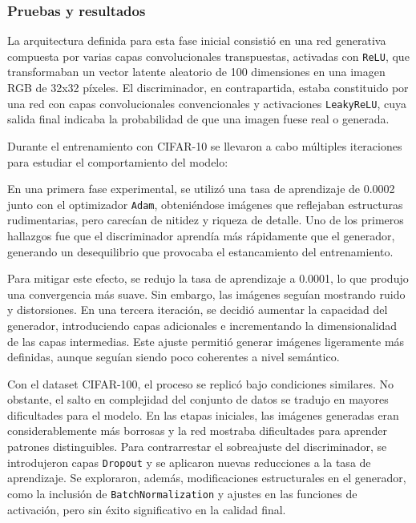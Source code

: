 \subsubsection{Pruebas y resultados}

La arquitectura definida para esta fase inicial consistió en una red generativa compuesta por varias capas convolucionales transpuestas, activadas con \texttt{ReLU}, que transformaban un vector latente aleatorio de 100 dimensiones en una imagen RGB de 32x32 píxeles. El discriminador, en contrapartida, estaba constituido por una red con capas convolucionales convencionales y activaciones \texttt{LeakyReLU}, cuya salida final indicaba la probabilidad de que una imagen fuese real o generada.

Durante el entrenamiento con CIFAR-10 se llevaron a cabo múltiples iteraciones para estudiar el comportamiento del modelo:

En una primera fase experimental, se utilizó una tasa de aprendizaje de 0.0002 junto con el optimizador \texttt{Adam}, obteniéndose imágenes que reflejaban estructuras rudimentarias, pero carecían de nitidez y riqueza de detalle. Uno de los primeros hallazgos fue que el discriminador aprendía más rápidamente que el generador, generando un desequilibrio que provocaba el estancamiento del entrenamiento.

Para mitigar este efecto, se redujo la tasa de aprendizaje a 0.0001, lo que produjo una convergencia más suave. Sin embargo, las imágenes seguían mostrando ruido y distorsiones. En una tercera iteración, se decidió aumentar la capacidad del generador, introduciendo capas adicionales e incrementando la dimensionalidad de las capas intermedias. Este ajuste permitió generar imágenes ligeramente más definidas, aunque seguían siendo poco coherentes a nivel semántico.

Con el dataset CIFAR-100, el proceso se replicó bajo condiciones similares. No obstante, el salto en complejidad del conjunto de datos se tradujo en mayores dificultades para el modelo. En las etapas iniciales, las imágenes generadas eran considerablemente más borrosas y la red mostraba dificultades para aprender patrones distinguibles. Para contrarrestar el sobreajuste del discriminador, se introdujeron capas \texttt{Dropout} y se aplicaron nuevas reducciones a la tasa de aprendizaje. Se exploraron, además, modificaciones estructurales en el generador, como la inclusión de \texttt{BatchNormalization} y ajustes en las funciones de activación, pero sin éxito significativo en la calidad final.

